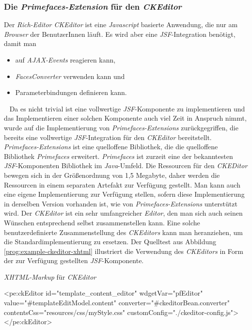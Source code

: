 \subsubsection{Die \emph{Primefaces-Extension} für den \emph{CKEditor}}
Der \emph{Rich-Editor CKEditor} ist eine \emph{Javascript} basierte Anwendung, die nur am \emph{Browser} der BenutzerInnen läuft. Es wird aber eine \emph{JSF}-Integration benötigt, damit man
\begin{itemize}
	\item auf \emph{AJAX-Events} reagieren kann,
	\item\emph{FacesConverter} verwenden kann und
	\item Parameterbindungen definieren kann.
\end{itemize}
\ \newline
Da es nicht trivial ist eine vollwertige \emph{JSF}-Komponente zu implementieren und das Implementieren einer solchen Komponente auch viel Zeit in Anspruch nimmt, wurde auf die Implementierung von \emph{Primefaces-Extensions} zurückgegriffen, die bereits eine vollwertige \emph{JSF}-Integration für den \emph{CKEditor} bereitstellt. \emph{Primefaces-Extensions} ist eine quelloffene Bibliothek, die die quelloffene Bibliothek \emph{Primefaces} erweitert. \emph{Primefaces} ist zurzeit eine der bekanntesten \emph{JSF}-Komponenten Bibliothek im \emph{Java}-Umfeld.
\newline
\newline
Die Ressourcen für den \emph{CKEDitor} bewegen sich in der Größenordnung von 1,5 Megabyte, daher werden die Ressourcen in einem separaten Artefakt zur Verfügung gestellt. Man kann auch eine eigene Implementierung zur Verfügung stellen, sofern diese Implementierung in derselben  Version vorhanden ist, wie von \emph{Primefaces-Extensions} unterstützt wird. Der \emph{CKEditor} ist ein sehr umfangreicher \emph{Editor}, den man sich auch seinen Wünschen entsprechend selbst zusammenstellen kann. Eine solche benutzerdefinierte Zusammenstellung des \emph{CKEditors} kann man heranziehen, um die Standardimplementierung zu ersetzen.
\newline
\newline
Der Quelltest aus Abbildung \ref{prog:example-ckeditor-xhtml} illustriert die Verwendung des \emph{CKEditors} in Form der zur Verfügung gestellten \emph{JSF}-Komponente.
\begin{program}[h]
\caption{\emph{XHTML-Markup} für \emph{CKEditor}}
\label{prog:example-ckeditor-xhtml}
\begin{HtmlCode}
<pe:ckEditor id="template_content_editor"
             wdgetVar="pfEditor"
             value="#{templateEditModel.content}"
             converter="#{ckeditorBean.converter}" 
             contentsCss="resources/css/myStyle.css"
             customConfig="./ckeditor-config.js">
</pe:ckEditor>
\end{HtmlCode}
\end{program}
